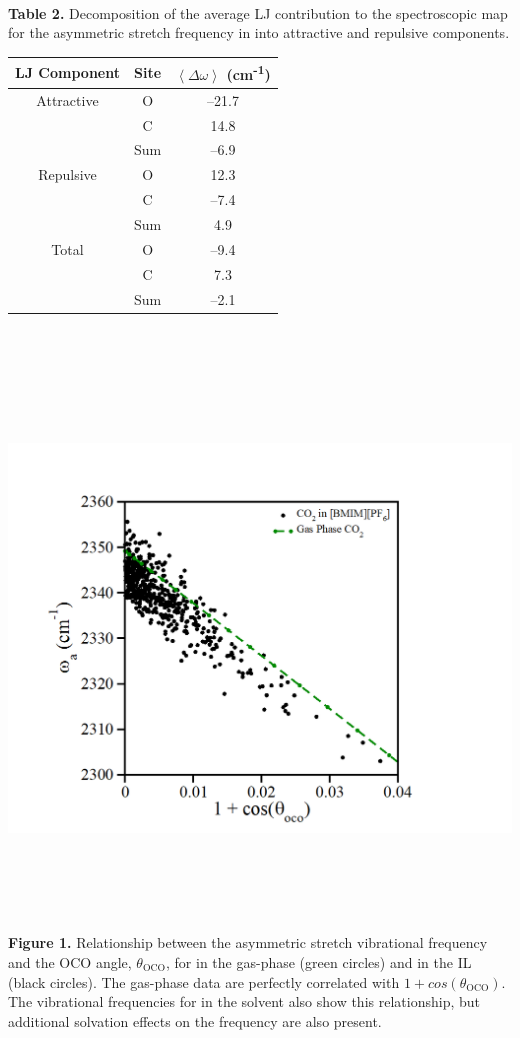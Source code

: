 \documentclass[]{article}
\begin{document}
\textbf{\\
}

\textbf{Table 2.} Decomposition of the average LJ contribution to the spectroscopic map for the  asymmetric stretch frequency in \ce{[C4C1im][PF6]} into attractive and repulsive components.

\begin{longtable}[]{@{}ccc@{}}
\toprule
LJ Component & Site & \(\left\langle \Delta\omega \right\rangle\)
(cm\textsuperscript{-1})\tabularnewline
\midrule
\endhead
Attractive & O & --21.7\tabularnewline
& C & 14.8\tabularnewline
& Sum & --6.9\tabularnewline
Repulsive & O & 12.3\tabularnewline
& C & --7.4\tabularnewline
& Sum & 4.9\tabularnewline
Total & O & --9.4\tabularnewline
& C & 7.3\tabularnewline
& Sum & --2.1\tabularnewline
\bottomrule
\end{longtable}

\emph{\\
}

\includegraphics[width=6.43125in,height=5.7659in]{figure1.png}

\textbf{Figure 1.} Relationship between the  asymmetric stretch vibrational frequency and the OCO angle, \(\theta_{\text{OCO}}\), for  in the gas-phase (green circles) and in the \ce{[C4C1im][PF6]} IL (black circles). The gas-phase data are perfectly correlated with \(1 + cos(\theta_{\text{OCO}})\). The vibrational frequencies for  in the \ce{[C4C1im][PF6]} solvent also show this relationship, but additional solvation effects on the frequency are also present.
\end{document}
